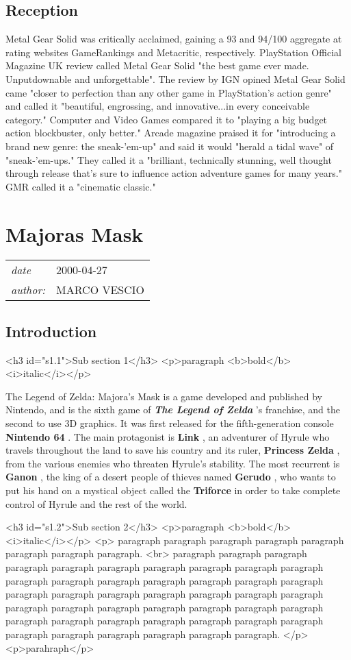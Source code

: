 \documentclass[a4paper,10pt]{book}
\newcommand{\pageHeader}[4]{
    \section{#1}
    \vspace{-0.3cm}
    \begin{table}[h!]
     \begin{tabular}{ll}
        \hline
        \textit{date} & #2 \\
        \textit{author: } & #3\\
        \hline
     \end{tabular}
    \end{table}
    \vspace{-0.3cm}
}
\begin{document}
 \subsection{Reception }
 
          Metal Gear Solid was critically acclaimed, gaining a 93 and 94/100 aggregate at rating websites GameRankings and Metacritic, respectively. 
          PlayStation Official Magazine  UK review called Metal Gear Solid "the best game ever made. Unputdownable and unforgettable". The review by IGN opined Metal Gear Solid came "closer to perfection than any other game in PlayStation's action genre" and called it "beautiful, engrossing, and innovative...in every conceivable category." 
          Computer and Video Games compared it to "playing a big budget action blockbuster, only better." Arcade magazine praised it for "introducing a brand new genre: the sneak-'em-up" and said it would "herald a tidal wave" of "sneak-'em-ups." They called it a "brilliant, technically stunning, well thought through release that's sure to influence action adventure games for many years."
          GMR called it a "cinematic classic."
         
 \newpage\pageHeader{Majoras Mask}{2000-04-27}{MARCO VESCIO}{A webpage about Majora's Mask}
 \subsection{Introduction }
 <h3 id="s1.1">Sub section 1</h3> 
 <p>paragraph <b>bold</b> <i>italic</i></p> 
 
          The Legend of Zelda: Majora's Mask is a game developed and published by Nintendo, and is the sixth game of  \textbf{\textit{The Legend of Zelda }} 's franchise, and the second to use 3D graphics.
          It was first released for the fifth-generation console  \textbf{Nintendo 64 } . The main protagonist is  \textbf{Link } , an adventurer of Hyrule who travels throughout the land to save his country
          and its ruler,  \textbf{Princess Zelda } , from the various enemies who threaten Hyrule's stability. The most recurrent is  \textbf{Ganon } , the king of a desert people of thieves named  \textbf{Gerudo } ,
          who wants to put his hand on a mystical object called the  \textbf{Triforce }  in order to take complete control of Hyrule and the rest of the world.
         
 <h3 id="s1.2">Sub section 2</h3>
        <p>paragraph <b>bold</b> <i>italic</i></p>
        <p>
          paragraph paragraph paragraph paragraph paragraph paragraph paragraph paragraph. <br>
          paragraph paragraph paragraph paragraph paragraph paragraph paragraph paragraph paragraph paragraph paragraph paragraph paragraph paragraph paragraph paragraph paragraph paragraph
           paragraph paragraph paragraph paragraph paragraph paragraph paragraph paragraph paragraph paragraph paragraph paragraph paragraph paragraph paragraph paragraph paragraph paragraph
           paragraph paragraph paragraph paragraph paragraph paragraph paragraph paragraph.
        </p>
        <p>parahraph</p> 
\end{document}
